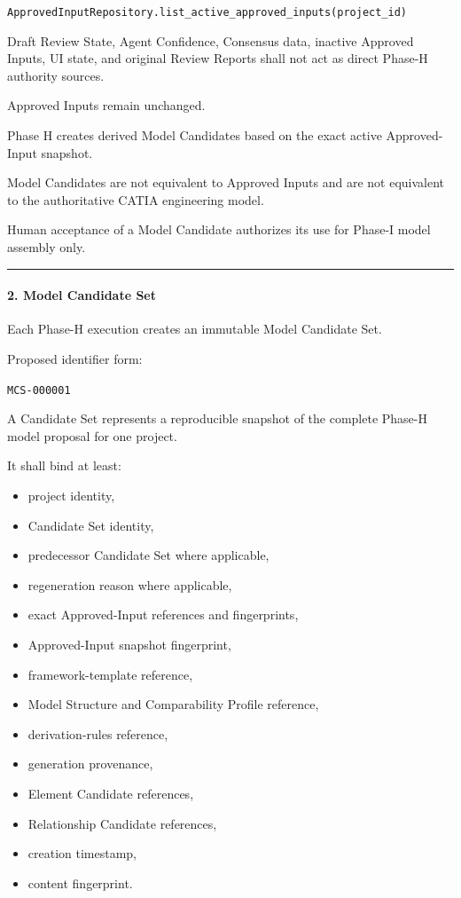 \texttt{ApprovedInputRepository.list\_active\_approved\_inputs(project\_id)}

Draft Review State, Agent Confidence, Consensus data, inactive Approved Inputs, UI state, and original Review Reports shall not act as direct Phase-H authority sources.

Approved Inputs remain unchanged.

Phase H creates derived Model Candidates based on the exact active Approved-Input snapshot.

Model Candidates are not equivalent to Approved Inputs and are not equivalent to the authoritative CATIA engineering model.

Human acceptance of a Model Candidate authorizes its use for Phase-I model assembly only.

\begin{center}\rule{0.5\linewidth}{0.5pt}\end{center}

\hypertarget{2-model-candidate-set}{%
\paragraph{2. Model Candidate Set}\label{2-model-candidate-set}}

Each Phase-H execution creates an immutable Model Candidate Set.

Proposed identifier form:

\texttt{MCS-000001}

A Candidate Set represents a reproducible snapshot of the complete Phase-H model proposal for one project.

It shall bind at least:

\begin{itemize}
\tightlist
\item
  project identity,
\item
  Candidate Set identity,
\item
  predecessor Candidate Set where applicable,
\item
  regeneration reason where applicable,
\item
  exact Approved-Input references and fingerprints,
\item
  Approved-Input snapshot fingerprint,
\item
  framework-template reference,
\item
  Model Structure and Comparability Profile reference,
\item
  derivation-rules reference,
\item
  generation provenance,
\item
  Element Candidate references,
\item
  Relationship Candidate references,
\item
  creation timestamp,
\item
  content fingerprint.
\end{itemize}

